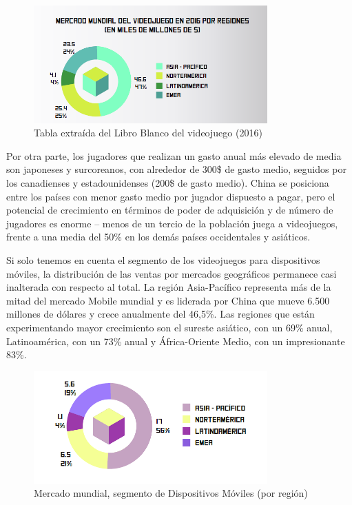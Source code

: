 \begin{figure}[h]
	\includegraphics[width=0.8\textwidth]{images/estadodelarte/mercado/ganancia-por-region}
	\centering
	\caption{Tabla extraída del Libro Blanco del videojuego (2016)}
\end{figure}

Por otra parte, los jugadores que realizan un gasto anual más elevado de media son japoneses y surcoreanos, con alrededor de 300\$ de gasto medio, seguidos por los canadienses y estadounidenses (200\$ de gasto medio). China se posiciona entre los países con menor gasto medio por jugador dispuesto a pagar, pero el potencial de crecimiento en términos de poder de adquisición y de número de jugadores es enorme – menos de un tercio de la población juega a videojuegos, frente a una media del 50\% en los demás países occidentales y asiáticos.

Si solo tenemos en cuenta el segmento de los videojuegos para dispositivos móviles, la distribución de las ventas por mercados geográficos permanece casi inalterada con respecto al total. La región Asia-Pacífico representa más de la mitad del mercado Mobile mundial y es liderada por China que mueve 6.500 millones de dólares y crece anualmente del 46,5\%. Las regiones que están experimentando mayor crecimiento son el sureste asiático, con un 69\% anual, Latinoamérica, con un 73\% anual y África-Oriente Medio, con un impresionante 83\%.

\begin{figure}[h]
	\includegraphics[width=0.8\textwidth]{images/estadodelarte/mercado/ganancia-movil-por-region}
	\centering
	\caption{Mercado mundial, segmento de Dispositivos Móviles (por región)}
\end{figure}

